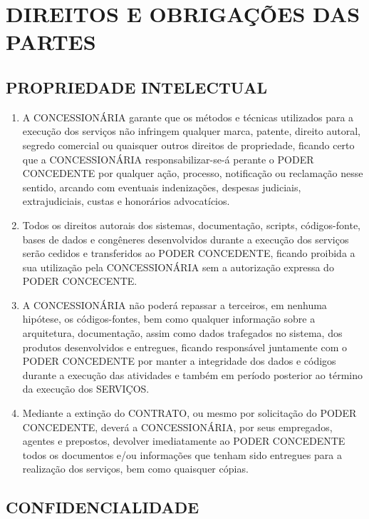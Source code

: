 \documentclass[a4paper,11pt]{report} %
\begin{document}
\chapter{DIREITOS E OBRIGAÇÕES DAS PARTES}
\section{PROPRIEDADE INTELECTUAL}
\label{sec:NSRM}

\begin{enumerate}
\item \label{itm:5BHL} A CONCESSIONÁRIA garante que os métodos e técnicas utilizados para a execução dos serviços não infringem qualquer marca, patente, direito autoral, segredo comercial ou quaisquer outros direitos de propriedade, ficando certo que a CONCESSIONÁRIA responsabilizar-se-á perante o PODER CONCEDENTE por qualquer ação, processo, notificação ou reclamação nesse sentido, arcando com eventuais indenizações, despesas judiciais, extrajudiciais, custas e honorários advocatícios.
\item \label{itm:723E} Todos os direitos autorais dos sistemas, documentação, scripts, códigos-fonte, bases de dados e congêneres desenvolvidos durante a execução dos serviços serão cedidos e transferidos ao PODER CONCEDENTE, ficando proibida a sua utilização pela CONCESSIONÁRIA sem a autorização expressa do PODER CONCECENTE.
\item \label{itm:7BBJ} A CONCESSIONÁRIA não poderá repassar a terceiros, em nenhuma hipótese, os códigos-fontes, bem como qualquer informação sobre a arquitetura, documentação, assim como dados trafegados no sistema, dos produtos desenvolvidos e entregues, ficando responsável juntamente com o PODER CONCEDENTE por manter a integridade dos dados e códigos durante a execução das atividades e também em período posterior ao término da execução dos SERVIÇOS.
\item \label{itm:628D} Mediante a extinção do CONTRATO, ou mesmo por solicitação do PODER CONCEDENTE, deverá a CONCESSIONÁRIA, por seus empregados, agentes e prepostos, devolver imediatamente ao PODER CONCEDENTE todos os documentos e/ou informações que tenham sido entregues para a realização dos serviços, bem como quaisquer cópias.
\end{enumerate}

\section{CONFIDENCIALIDADE}
\label{sec:PLXA}
\end{document}
